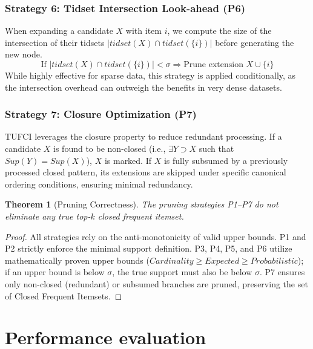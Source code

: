 \documentclass[10pt,letterpaper]{article}
\newtheorem{theorem}{Theorem}
\newcounter{definition}
\begin{document}
\subsubsection*{Strategy 6: Tidset Intersection Look-ahead (P6)}
When expanding a candidate $X$ with item $i$, we compute the size of the intersection of their tidsets $|\mathit{tidset}(X) \cap \mathit{tidset}(\{i\})|$ before generating the new node.
\begin{equation}
\text{If } |\mathit{tidset}(X) \cap \mathit{tidset}(\{i\})| < \sigma \Rightarrow \text{Prune extension } X \cup \{i\}
\end{equation}
While highly effective for sparse data, this strategy is applied conditionally, as the intersection overhead can outweigh the benefits in very dense datasets.

\subsubsection*{Strategy 7: Closure Optimization (P7)}
TUFCI leverages the closure property to reduce redundant processing. If a candidate $X$ is found to be non-closed (i.e., $\exists Y \supset X$ such that $Sup(Y) = Sup(X)$), $X$ is marked. If $X$ is fully subsumed by a previously processed closed pattern, its extensions are skipped under specific canonical ordering conditions, ensuring minimal redundancy.

\begin{theorem}[Pruning Correctness]
\label{thm:pruning}
The pruning strategies P1–P7 do not eliminate any true top-$k$ closed frequent itemset.
\end{theorem}

\begin{proof}
All strategies rely on the anti-monotonicity of valid upper bounds. P1 and P2 strictly enforce the minimal support definition. P3, P4, P5, and P6 utilize mathematically proven upper bounds ($Cardinality \ge Expected \ge Probabilistic$); if an upper bound is below $\sigma$, the true support must also be below $\sigma$. P7 ensures only non-closed (redundant) or subsumed branches are pruned, preserving the set of Closed Frequent Itemsets.
\end{proof}




\section*{Performance evaluation}
\end{document}
